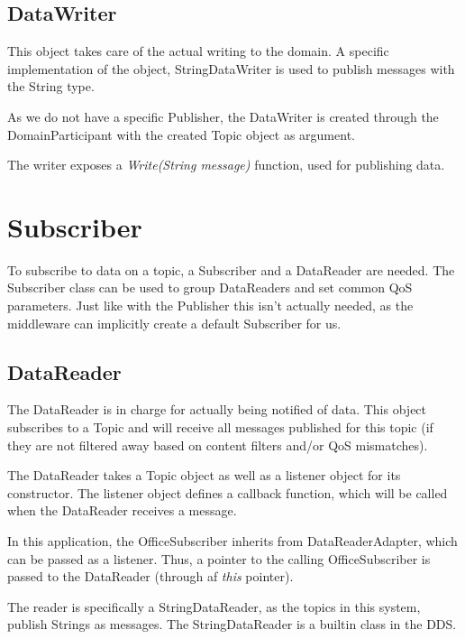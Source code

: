 \subsection{DataWriter}
This object takes care of the actual writing to the domain. A specific implementation of the object, StringDataWriter is used to publish messages with the String type. 

As we do not have a specific Publisher, the DataWriter is created through the DomainParticipant with the created Topic object as argument.

\begin{center}
\end{center}

The writer exposes a \textit{Write(String message)} function, used for publishing data.

\section{Subscriber}
To subscribe to data on a topic, a Subscriber and a DataReader are needed. The Subscriber class can be used to group DataReaders and set common QoS parameters. Just like with the Publisher this isn't actually needed, as the middleware can implicitly create a default Subscriber for us. 

\subsection{DataReader}
The DataReader is in charge for actually being notified of data. This object subscribes to a Topic and will receive all messages published for this topic (if they are not filtered away based on content filters and/or QoS mismatches). 

The DataReader takes a Topic object as well as a listener object for its constructor. The listener object defines a callback function, which will be called when the DataReader receives a message.

In this application, the OfficeSubscriber inherits from DataReaderAdapter, which can be passed as a listener. Thus, a pointer to the calling OfficeSubscriber is passed to the DataReader (through af \textit{this} pointer).

The reader is specifically a StringDataReader, as the topics in this system, publish Strings as messages. The StringDataReader is a builtin class in the DDS. 

